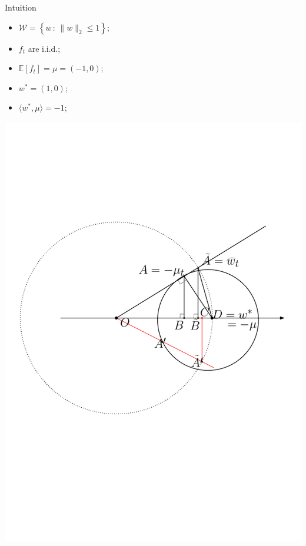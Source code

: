 \documentclass[final]{beamer} %
\newcommand{\cW}{\mathcal{W}}
\newcommand{\Exp}[1]{\mathbb{E}\left[ #1 \right]}
\newcommand{\ip}[1]{\langle#1\rangle}
\newcommand{\set}[2]{\left\{#1 \,:\, #2 \right\}}
\begin{document}
\begin{frame}[c]
\begin{columns}[t,totalwidth=\textwidth]
\begin{column}{.32\textwidth}
		\begin{block}{Intuition}
						\begin{minipage}[b]{0.55\textwidth}
						\begin{itemize}
							\item $\cW = \set{w}{\|w\|_2\le 1}$;
							\item $f_t$ are i.i.d.;
							\item $\Exp{f_t} = \mu = (-1,0)$;
							\item $w^* = (1,0)$;
							\item $\ip{w^*,\mu} = -1$;
						\end{itemize}
						\end{minipage}
						\begin{minipage}[b]{0.37\textwidth}
						{\includegraphics[width=\textwidth, trim={6.2cm 6cm 2cm 0},clip]{figures/ExcessError}}
						\end{minipage}
					

\end{block}
\end{column}
\end{columns}
\end{frame}
\end{document}
